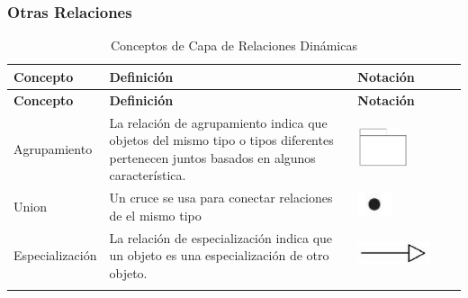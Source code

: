 \subsubsection{Otras Relaciones}
\begin{center}
	\begin{longtable}[H]{| >{\centering\arraybackslash}m{3cm} | >{\arraybackslash}m{6cm} | p{4cm} | p{5cm} | p{4cm} |}
		
		\hline
		\textbf{Concepto} &  \centering \textbf{Definición} & \textbf{Notación} \\
		\hline
		\endfirsthead
		
		
		\hline
		\textbf{Concepto} &  \centering \textbf{Definición} & \textbf{Notación} \\
		\hline
		\endhead
		
		Agrupamiento     
		& \vspace{1mm} La relación de agrupamiento indica que
		objetos del mismo tipo o tipos diferentes
		pertenecen juntos basados en algunos
		característica.   
		&\includegraphics[width=15mm,trim=0 0 0 -2mm]{imagenes/lenguaje/relaciones/agrupacion}  \\ \hline
		
		Union
		& \vspace{1mm} Un cruce se usa para conectar relaciones de
		el mismo tipo
		& \includegraphics[width=10mm,trim=0 0 0 -2mm]{imagenes/lenguaje/relaciones/union}  \\ \hline
		
		
		
		Especialización
		& \vspace{1mm}La relación de especialización indica que
		un objeto es una especialización de otro objeto.
		& \includegraphics[width=35mm,trim=0 0 0 -2mm]{imagenes/lenguaje/relaciones/especializacion}  \\ \hline
		
		
		\caption{Conceptos de Capa de Relaciones Dinámicas}
		
	\end{longtable}
\end{center}
